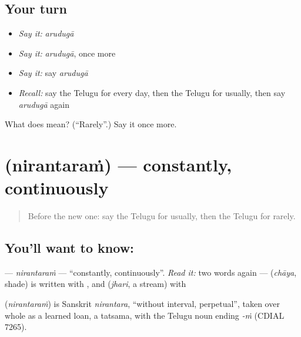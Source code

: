\subsection*{Your turn}
\begin{itemize}
\raggedright
  \item \emph{Say it:} \emph{arudugā}
  \item \emph{Say it:} \emph{arudugā}, once more
  \item \emph{Say it:} say \emph{arudugā}
  \item \emph{Recall:} say the Telugu for every day, then the Telugu for usually, then say \emph{arudugā} again
\end{itemize}

\begin{tcolorbox}[breakable,colback=teal!4,colframe=teal!35!black,title={Before you move on}]
What does  mean? (\textquotedblleft{}Rarely\textquotedblright{}.) Say it once more.
\end{tcolorbox}
\section[\texorpdfstring{\te{నిరంతరం} (nirantaraṁ)}{నిరంతరం (nirantaraṁ)}]{ (nirantaraṁ) — constantly, continuously}

\label{lesson:TE-C171-nirantaram}



\begin{quote}
Before the new one: say the Telugu for usually, then the Telugu for rarely.
\end{quote}

\subsection*{You'll want to know: }
\textbf{} — \emph{nirantaraṁ} — \textquotedblleft{}constantly, continuously\textquotedblright{}. \emph{Read it:} two words again — \textbf{} (\emph{chāya}, shade) is written with , and \textbf{} (\emph{jhari}, a stream) with 

\begin{cousinweb}
\textbf{} (\emph{nirantaraṁ}) is Sanskrit \emph{nirantara}, \textquotedblleft{}without interval, perpetual\textquotedblright{}, taken over whole as a learned loan, a tatsama, with the Telugu noun ending \emph{-ṁ} (CDIAL 7265).
\end{cousinweb}

